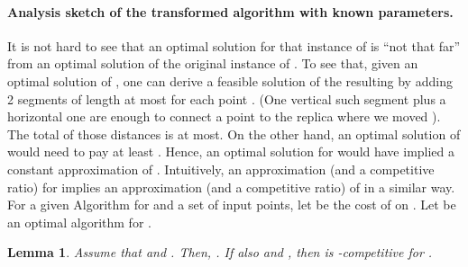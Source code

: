 \documentclass[11pt]{article}
\newtheorem{lem}[theorem]{Lemma}
\begin{document}
\paragraph*{\bf Analysis sketch of the transformed algorithm with known parameters\commsingle.\commsingleend}



It is not hard to see that an optimal solution for that instance of  is ``not that far'' from an optimal solution of the original instance of .
To see that, given an optimal solution of , one can derive a feasible solution of the resulting  by adding 2 segments of length at most   for each point . (One vertical such segment plus a horizontal one are enough to connect a point  to the replica
 where we moved ).
 The total of those distances is  at most.
On the other hand, an optimal solution of  would need to pay at least .
Hence, an optimal solution for  would have implied a constant approximation of .
Intuitively, an approximation (and a competitive ratio) for  implies an approximation (and a competitive ratio) of  in a similar way.
For a given Algorithm  for  and a set  of input points, let  be the cost of  on .
Let  be an optimal algorithm for .

\begin{lem}
Assume that  and .
Then, .
If also  and , then  is  -competitive for .
\label{lemma: onRSAn is O(sqrt log n)-competitve}
\end{lem}
\end{document}
